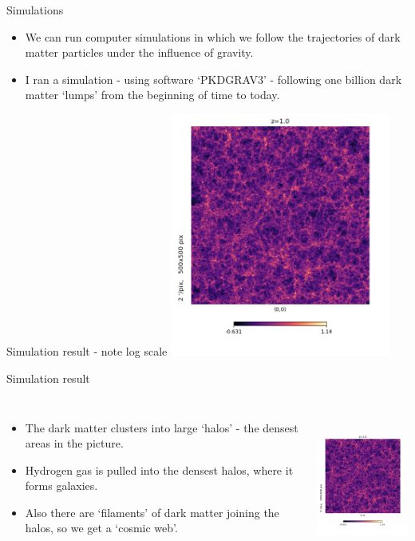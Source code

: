 \documentclass[usenames,dvipsnames]{beamer}
\begin{document}
\begin{frame}{Simulations}
  \begin{block}{}
    \begin{itemize}
      \item{We can run computer simulations in which we follow the trajectories of dark matter particles under the influence of gravity.}
	\item{I ran a simulation - using software `PKDGRAV3' - following one billion dark matter `lumps'  from the beginning of time to today.}
    \end{itemize}
  \end{block}
\end{frame}

\begin{frame}{Simulation result - note log scale}
    \centering
    \includegraphics[height=8cm]{simulation_z_1.png}
\end{frame}
  

\begin{frame}{Simulation result}
  \begin{columns}
    \begin{itemize}
      \item{The dark matter clusters into large `halos' - the densest areas in the picture.}
      \item{Hydrogen gas is pulled into the densest halos, where it forms galaxies.}
	\item{Also there are `filaments' of dark matter joining the halos, so we get a `cosmic web'.}
    \end{itemize}
    \centering
    \includegraphics[height=5cm]{simulation_z_1.png}
  \end{columns}
\end{frame}
\end{document}
